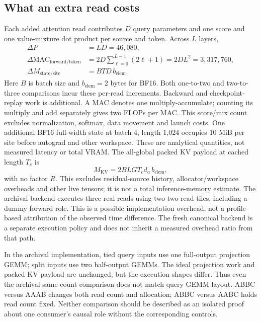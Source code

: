 \documentclass[11pt,letterpaper]{article}
\newcommand{\route}[1]{\textsf{#1}}
\begin{document}
\subsection{What an extra read costs}
Each added attention read contributes $D$ query parameters and one score and
one value-mixture dot product per source and token. Across $L$ layers,
\begin{align}
 \Delta P&=LD=46{,}080,\\
 \Delta\mathrm{MAC}_{\mathrm{forward/token}}
   &=2D\sum_{\ell=0}^{L-1}(2\ell+1)
     =2DL^2=3{,}317{,}760,\\
 \Delta M_{\mathrm{state/site}}&=BTD\,b_{\mathrm{elem}}.
 \label{eq:read-cost}
\end{align}
Here $B$ is batch size and $b_{\mathrm{elem}}=2$ bytes for BF16.
Both one-to-two and two-to-three comparisons incur these per-read increments.
Backward and checkpoint-replay work is additional. A MAC denotes one multiply-accumulate;
counting its multiply and add separately gives two FLOPs per MAC. This
score/mix count excludes normalization, softmax, data movement and launch costs.
One additional BF16 full-width state
at batch 4, length 1,024 occupies 10 MiB per site before autograd and other
workspace. These are analytical quantities, not measured latency or total VRAM.
The all-global packed KV payload at cached length $T_c$ is
\begin{equation}
 M_{\mathrm{KV}}=2BLG T_c d_a\,b_{\mathrm{elem}},
 \label{eq:kv-payload}
\end{equation}
with no factor $R$. This excludes residual-source history, allocator/workspace
overheads and other live tensors; it is not a total inference-memory estimate.
The archival backend executes three real reads using two two-read tiles,
including a dummy forward role. This is a possible implementation overhead,
not a profile-based attribution of the observed time difference. The fresh
canonical backend is a separate execution policy and does not inherit a
measured overhead ratio from that path.

In the archival implementation, tied query inputs use one full-output projection
GEMM; split inputs use two half-output GEMMs. The ideal projection work and
packed KV payload are unchanged, but the execution shapes differ. Thus even
the archival same-count comparison does not match query-GEMM layout.
\route{ABBC} versus \route{AAAB} changes both
read count and allocation; \route{ABBC} versus \route{AABC} holds read count
fixed. Neither comparison should be described as an isolated proof about one
consumer's causal role without the corresponding controls.
\end{document}
